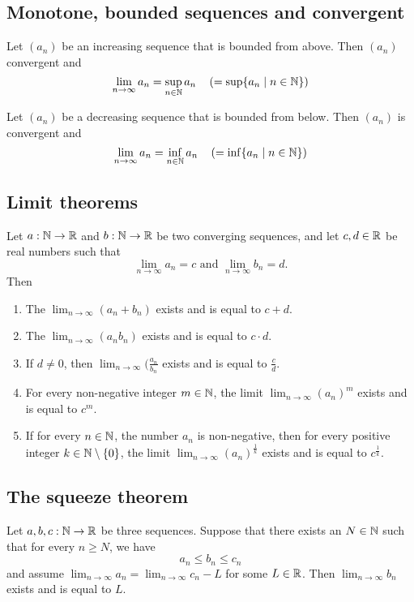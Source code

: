 \subsection{Monotone, bounded sequences and convergent}
\begin{theorem}
    Let $(a_n)$ be an increasing sequence that is bounded from above. Then $(a_n)$ convergent and
    $$\lim_{n\to\infty}a_n = \sup_{n\in\mathbb{N}}a_n \quad \left( = \sup \{a_n \mid n\in\mathbb{N}\}\right)$$
\end{theorem}

\begin{theorem}
    Let $(a_n)$ be a decreasing sequence that is bounded from below. Then $(a_n)$ is convergent and
    $$\lim_{n\to\infty}a_n = \inf_{n\in\mathbb{N}}a_n \quad \left( = \inf \{a_n \mid n\in\mathbb{N}\}\right)$$
\end{theorem}

\subsection{Limit theorems}
\begin{theorem}
    Let $a: \mathbb{N} \to \mathbb{R}$ and $b: \mathbb{N} \to \mathbb{R}$ be two converging sequences, and let $c,d \in \mathbb{R}$ be real numbers such that
    $$\lim_{n\to\infty}a_n = c \text{ and } \lim_{n\to\infty}b_n = d.$$
    Then
    \begin{enumerate}
        \item The $\lim_{n\to\infty}(a_n + b_n)$ exists and is equal to $c + d$.
        \item The $\lim_{n\to\infty}(a_nb_n)$ exists and is equal to $c \cdot d$.
        \item If $d \ne 0$, then $\lim_{n\to\infty}(\frac{a_n}{b_n}$ exists and is equal to $\frac{c}{d}$.
        \item For every non-negative integer $m \in \mathbb{N}$, the  limit $\lim_{n\to\infty}(a_n)^m$ exists and is equal to $c^m$.
        \item If for every $n \in \mathbb{N}$, the number $a_n$ is non-negative, then for every positive integer $k \in \mathbb{N} \setminus \{0\}$, the limit $\lim_{n\to\infty}(a_n)^{\frac{1}{k}}$ exists and is equal to $c^{\frac{1}{k}}$.
    \end{enumerate}
\end{theorem}

\subsection{The squeeze theorem}
\begin{theorem}
    Let $a,b,c : \mathbb{N} \to \mathbb{R}$ be three sequences. Suppose that there exists an $N \in \mathbb{N}$ such that for every $n \ge N$, we have
    $$a_n \le b_n \le c_n$$
    and assume $\lim_{n\to\infty}a_n = \lim_{n\to\infty}c_n - L$ for some $L \in \mathbb{R}$. Then $\lim_{n\to\infty}b_n$ exists and is equal to $L$.
\end{theorem}

